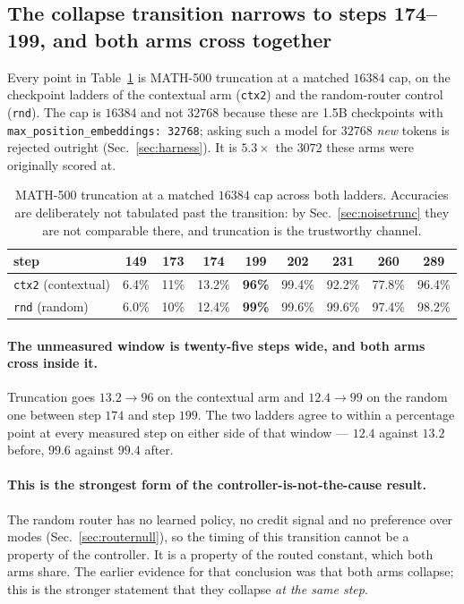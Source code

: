 \subsection{The collapse transition narrows to steps 174--199, and both arms cross together}
\label{sec:transition}

Every point in Table~\ref{tab:transition} is MATH-500 truncation at a matched $16384$ cap,
on the checkpoint ladders of the contextual arm (\texttt{ctx2}) and the random-router control
(\texttt{rnd}). The cap is $16384$ and not $32768$ because these are 1.5B checkpoints with
\texttt{max\_position\_embeddings: 32768}; asking such a model for $32768$ \emph{new} tokens
is rejected outright (Sec.~\ref{sec:harness}). It is $5.3\times$ the $3072$ these arms were
originally scored at.

\begin{table}[t]
\centering\small
\caption{MATH-500 truncation at a matched $16384$ cap across both ladders. Accuracies are
deliberately not tabulated past the transition: by Sec.~\ref{sec:noisetrunc} they are not
comparable there, and truncation is the trustworthy channel.}
\label{tab:transition}
\begin{tabular}{lcccccccc}
\toprule
step & 149 & 173 & 174 & 199 & 202 & 231 & 260 & 289 \\
\midrule
\texttt{ctx2} (contextual) & 6.4\% & 11\% & 13.2\% & \textbf{96\%} & 99.4\% & 92.2\% & 77.8\% & 96.4\% \\
\texttt{rnd} (random)      & 6.0\% & 10\% & 12.4\% & \textbf{99\%} & 99.6\% & 99.6\% & 97.4\% & 98.2\% \\
\bottomrule
\end{tabular}
\end{table}

\paragraph{The unmeasured window is twenty-five steps wide, and both arms cross inside it.}
Truncation goes $13.2 \to 96$ on the contextual arm and $12.4 \to 99$ on the random one
between step $174$ and step $199$. The two ladders agree to within a percentage point at every
measured step on either side of that window --- $12.4$ against $13.2$ before, $99.6$ against
$99.4$ after.

\paragraph{This is the strongest form of the controller-is-not-the-cause result.} The random
router has no learned policy, no credit signal and no preference over modes
(Sec.~\ref{sec:routernull}), so the timing of this transition cannot be a property of the
controller. It is a property of the routed constant, which both arms share. The earlier
evidence for that conclusion was that both arms collapse; this is the stronger statement that
they collapse \emph{at the same step}.


